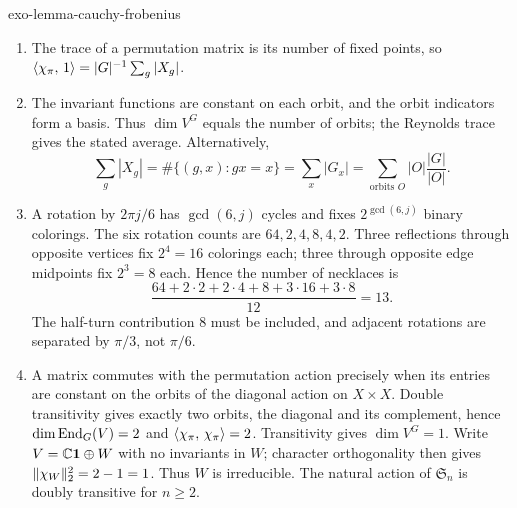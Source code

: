 \begin{correction}{exo-lemma-cauchy-frobenius}
\begin{enumerate}
\item The trace of a permutation matrix is its number of fixed points,
so $\langle \chi_\pi,\,1\rangle=|G|^{-1}\sum_g|X_g|$.
\item The invariant functions are constant on each orbit, and the orbit
indicators form a basis. Thus $\dim V^G$ equals the number of orbits;
the Reynolds trace gives the stated average. Alternatively,
\[
 \sum_g|X_g|=\#\{(g,x):gx=x\}=\sum_x|G_x|
           =\sum_{\text{orbits }O}|O|\frac{|G|}{|O|}.
\]
\item A rotation by $2\pi j/6$ has $\gcd(6,j)$ cycles and fixes
$2^{\gcd(6,j)}$ binary colorings. The six rotation counts are
$64,2,4,8,4,2$. Three reflections through opposite vertices fix
$2^4=16$ colorings each; three through opposite edge midpoints fix
$2^3=8$ each. Hence the number of necklaces is
\[
 \frac{64+2\cdot2+2\cdot4+8+3\cdot16+3\cdot8}{12}=13.
\]
The half-turn contribution $8$ must be included, and adjacent rotations
are separated by $\pi/3$, not $\pi/6$.
\item A matrix commutes with the permutation action precisely when its
entries are constant on the orbits of the diagonal action on $X\times X$.
Double transitivity gives exactly two orbits, the diagonal and its
complement, hence $\dim\operatorname{End}_G(V)=2$ and
$\langle \chi_\pi,\,\chi_\pi\rangle=2$. Transitivity gives $\dim V^G=1$.
Write $V=\mathbb{C}\mathbf1\oplus W$ with no invariants in $W$; character
orthogonality then gives $\lVert\chi_W\rVert_2^2=2-1=1$.
Thus $W$ is irreducible. The natural action of $\mathfrak S_n$ is
doubly transitive for $n\geq2$.
\end{enumerate}
\end{correction}

